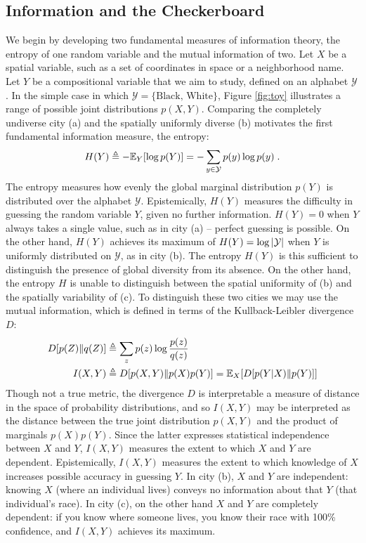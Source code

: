 	
\subsection{Information and the Checkerboard}
	We begin by developing two fundamental measures of information theory, the entropy of one random variable and the mutual information of two. Let $X$ be a spatial variable, such as a set of coordinates in space or a neighborhood name. Let $Y$ be a compositional variable that we aim to study, defined on an alphabet $\mathcal{Y}$. In the simple case in which $\mathcal{Y}  = \{\text{Black, White}\}$, Figure \ref{fig:toy} illustrates a range of possible joint distributions $p(X,Y)$. Comparing the completely undiverse city (a) and the spatially uniformly diverse (b) motivates the first fundamental information measure, the entropy:
	\begin{equation}
		H(Y) \triangleq -\mathbb{E}_Y[\log p(Y)] = - \sum_{y \in \mathcal{Y}} p(y) \log p(y)\;.
	\end{equation}
	The entropy measures how evenly the global marginal distribution $p(Y)$ is distributed over the alphabet $\mathcal{Y}$. Epistemically, $H(Y)$ measures the difficulty in guessing the random variable $Y$, given no further information. $H(Y) = 0$ when $Y$ always takes a single value, such as in city (a) -- perfect guessing is possible. On the other hand, $H(Y)$ achieves its maximum of $H(Y) = \log \left|\mathcal{Y}\right|$ when $Y$ is uniformly distributed on $\mathcal{Y}$, as in city (b). The entropy $H(Y)$ is this sufficient to distinguish the presence of global diversity from its absence. On the other hand, the entropy $H$ is unable to distinguish between the spatial uniformity of (b) and the spatially variability of (c). To distinguish these two cities we may use the mutual information, which is defined in terms of the Kullback-Leibler divergence $D$:
	\begin{align}
		D[p(Z)\|q(Z)] &\triangleq \sum_z p(z) \log \frac{p(z)}{q(z)} \\
		I(X,Y) &\triangleq D[p(X,Y) \| p(X)p(Y)] = \mathbb{E}_X[D[p(Y|X)\|p(Y)]]
	\end{align}
	Though not a true metric, the divergence $D$ is interpretable a measure of distance in the space of probability distributions, and so $I(X,Y)$ may be interpreted as the distance between the true joint distribution $p(X,Y)$ and the product of marginals $p(X)p(Y)$. Since the latter expresses statistical independence between $X$ and $Y$, $I(X,Y)$ measures the extent to which $X$ and $Y$ are dependent. Epistemically, $I(X,Y)$ measures the extent to which knowledge of $X$increases possible accuracy in guessing $Y$. In city (b), $X$ and $Y$ are independent: knowing $X$ (where an individual lives) conveys no information about that $Y$ (that individual's race).  In city (c), on the other hand $X$ and $Y$ are completely dependent: if you know where someone lives, you know their race with 100\% confidence, and $I(X,Y)$ achieves its maximum. 

